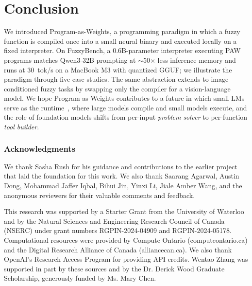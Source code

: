 \documentclass{article}
\theoremstyle{plain}
\theoremstyle{definition}
\theoremstyle{remark}
\begin{document}
\section{Conclusion}
\label{sec:conclusion}

We introduced Program-as-Weights, a programming paradigm in which a fuzzy function is compiled once into a small neural binary and executed locally on a fixed interpreter. On FuzzyBench, a 0.6B-parameter interpreter executing PAW programs matches Qwen3-32B prompting at $\sim$50$\times$ less inference memory and runs at 30~tok/s on a MacBook M3 with quantized GGUF; we illustrate the paradigm through five case studies. The same abstraction extends to image-conditioned fuzzy tasks by swapping only the compiler for a vision-language model. We hope Program-as-Weights contributes to a future in which small LMs serve as the runtime~\citep{belcak2025smalllanguagemodelsfuture}, where large models compile and small models execute, and the role of foundation models shifts from per-input \emph{problem solver} to per-function \emph{tool builder}.


\subsubsection*{Acknowledgments}
We thank Sasha Rush for his guidance and contributions to the earlier project that laid the foundation for this work. We also thank Saarang Agarwal, Austin Dong, Mohammad Jaffer Iqbal, Bihui Jin, Yinxi Li, Jiale Amber Wang, and the anonymous reviewers for their valuable comments and feedback.

This research was supported by a Starter Grant from the University of Waterloo and by the Natural Sciences and Engineering Research Council of Canada (NSERC) under grant numbers RGPIN-2024-04909 and RGPIN-2024-05178. Computational resources were provided by Compute Ontario (computeontario.ca) and the Digital Research Alliance of Canada (alliancecan.ca). We also thank OpenAI's Research Access Program for providing API credits. Wentao Zhang was supported in part by these sources and by the Dr. Derick Wood Graduate Scholarship, generously funded by Ms. Mary Chen.

\end{document}

